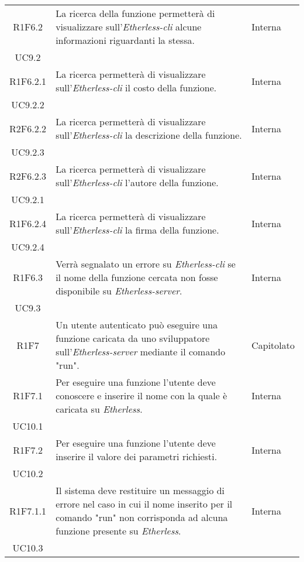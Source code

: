 \begin{longtable}{|c|p{8cm}|C{2cm}|}
	R1F6.2 &  La ricerca della funzione permetterà di visualizzare sull'\textit{Etherless-cli} alcune informazioni riguardanti la stessa.  & \centering Interna \\ UC9.2 \tabularnewline
	
	R1F6.2.1 &  La ricerca permetterà di visualizzare sull'\textit{Etherless-cli} il costo della funzione.  & \centering Interna \\ UC9.2.2 \tabularnewline

	R2F6.2.2 &  La ricerca permetterà di visualizzare sull'\textit{Etherless-cli} la descrizione della funzione.  & \centering Interna \\ UC9.2.3 \tabularnewline	
	
	R2F6.2.3 &  La ricerca permetterà di visualizzare sull'\textit{Etherless-cli} l'autore della funzione.  & \centering Interna \\ UC9.2.1 \tabularnewline
	
	R1F6.2.4 &  La ricerca permetterà di visualizzare sull'\textit{Etherless-cli} la firma della funzione.  & \centering Interna \\ UC9.2.4 \tabularnewline
	
	R1F6.3 &  Verrà segnalato un errore su \textit{Etherless-cli} se il nome della funzione cercata non fosse disponibile su \textit{Etherless-server}.  & \centering Interna \\ UC9.3 \tabularnewline
	
	R1F7 &  Un utente autenticato può eseguire una funzione caricata da uno sviluppatore sull'\textit{Etherless-server} mediante il comando "run".  & Capitolato \\
	
	R1F7.1 &  Per eseguire una funzione l'utente deve conoscere e inserire il nome con la quale è caricata su \textit{Etherless}.  & \centering Interna \\ UC10.1 \tabularnewline
	
	R1F7.2 &  Per eseguire una funzione l'utente deve inserire il valore dei parametri richiesti.  & \centering Interna \\ UC10.2 \tabularnewline

	R1F7.1.1 &  Il sistema deve restituire un messaggio di errore nel caso in cui il nome inserito per il comando "run" non corrisponda ad alcuna funzione presente su \textit{Etherless}.  & \centering Interna \\ UC10.3 \tabularnewline
	

\end{longtable}
